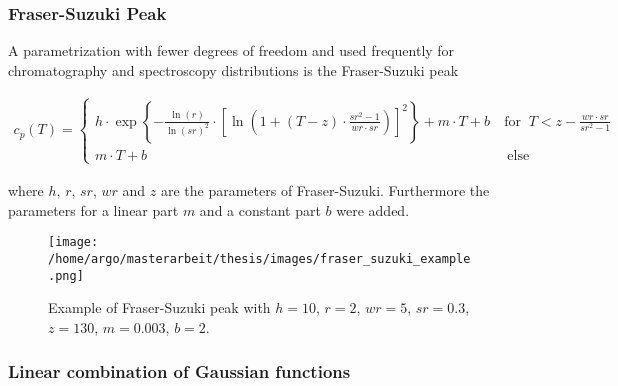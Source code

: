 \documentclass{scrartcl}[12pt, halfparskip]
\numberwithin{equation}{section}
\numberwithin{figure}{section}
\numberwithin{table}{section}
\begin{document}
\subsubsection{Fraser-Suzuki Peak}
\label{sec:parametrization_FS}

A parametrization with fewer degrees of freedom and used frequently for chromatography and spectroscopy distributions is the Fraser-Suzuki peak \cite{fraser_suzuki_1} \cite{fraser_suzuki_many_fcts}

\begin{align}
	c_p(T) =
	\begin{cases}
		h \cdot \exp \left\{ - \frac{\ln(r)}{\ln(sr)^2} \cdot \left[ \ln\left( 1 + (T-z) \cdot \frac{sr^2 - 1}{wr \cdot sr} \right) \right]^2 \right\} + m \cdot T + b \ & \text{for } \ T < z - \frac{wr \cdot sr}{sr^2 - 1} \\
		m \cdot T + b \ & \ \text{else}
	\end{cases}
	\label{eq:fraser_suzuki}
\end{align}

where $h$, $r$, $sr$, $wr$ and $z$ are the parameters of Fraser-Suzuki. Furthermore the parameters for a linear part $m$ and a constant part $b$ were added. 

\begin{figure}[H]
	\centering
	\texttt{[image: /home/argo/masterarbeit/thesis/images/fraser\_suzuki\_example.png]}
	\caption{Example of Fraser-Suzuki peak with $h=10$, $r=2$, $wr=5$, $sr=0.3$, $z=130$, $m=0.003$, $b=2$.}
	\label{fig:parametrization_example_fraser_suzuki}
\end{figure}



\subsubsection{Linear combination of Gaussian functions}
\label{sec:parametrization_Gausse}
\end{document}
